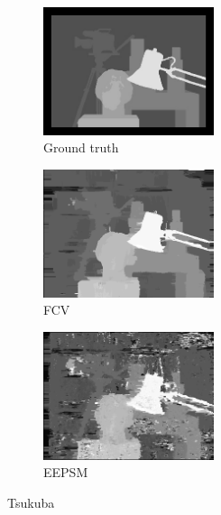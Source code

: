 \begin{figure}[ht]
  \centering
  \begin{subfigure}[t]{0.3\textwidth}
    \centering\includegraphics[width=5cm]{figures/tsu_gt}
    \caption{Ground truth \label{fig:tsu_gt}}
  \end{subfigure}\hspace{0.5cm}
  \begin{subfigure}[t]{0.3\textwidth}
    \centering\includegraphics[width=5cm]{figures/tsu_fcv}
    \caption{FCV\label{fig:tsu_fcv}}
  \end{subfigure}\hspace{0.5cm}
  \begin{subfigure}[t]{0.3\textwidth}
    \centering\includegraphics[width=5cm]{figures/tsu_eepsm1}
    \caption{EEPSM\label{fig:tsu_eepsm}}
  \end{subfigure}
  \caption{Tsukuba \cite{Scharstein2002}\label{fig:tsuall}}
\end{figure}

